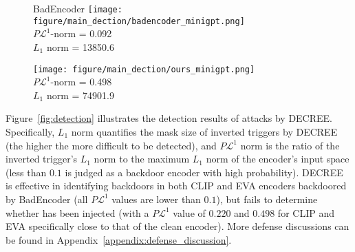 \begin{figure*}[t]
\begin{subfigure}[b]{0.15\textwidth}
\begin{minipage}{0.9\linewidth}
        \end{minipage}
    \end{subfigure}
    \begin{subfigure}[b]{0.135\textwidth}
        \centering
        \parbox{\linewidth}{\small BadEncoder \texttt{[image: figure/main\_dection/badencoder\_minigpt.png]} \\ \centering \scriptsize $P\mathcal{L}^1$-norm = 0.092 \\ $L_1$ norm = 13850.6}
    \end{subfigure}
    \begin{subfigure}[b]{0.135\textwidth}
        \centering
        \parbox{\linewidth}{\small \project \texttt{[image: figure/main\_dection/ours\_minigpt.png]} \\ \centering \scriptsize $P\mathcal{L}^1$-norm = 0.498 \\ $L_1$ norm = 74901.9}
    \end{subfigure}
    \vspace{-5pt}
    \caption{Backdoor detection results by DECREE~\cite{feng2023detecting}. $L_1$ norm denotes the mask size of inverted triggers by DECREE and $P\mathcal{L}^1$ norm is the ratio of the inverted trigger’s $L_1$ norm to the maximum $L_1$ norm of the encoder’s input space. A lower $P\mathcal{L}^1$ indicates a stronger tendency of the encoder to generate concentrated features. An encoder is deemed backdoored if its $P\mathcal{L}^1$ falls below $0.1$ ~\cite{feng2023detecting}.
    }
    \label{fig:detection}
    \vspace{-10px}
\end{figure*}
\noindent Figure~\ref{fig:detection} illustrates the detection results of attacks by DECREE. Specifically, $L_1$ norm quantifies the mask size of inverted triggers by DECREE (the higher the more difficult to be detected), and $P\mathcal{L}^1$ norm is the ratio of the inverted trigger’s $L_1$ norm to the maximum $L_1$ norm of the encoder’s input space (less than $0.1$ is judged as a backdoor encoder with high probability). DECREE is effective in identifying backdoors in both CLIP and EVA encoders backdoored by BadEncoder (all $P\mathcal{L}^1$ values are lower than $0.1$), but fails to determine whether \project has been injected (with a $P\mathcal{L}^1$ value of $0.220$ and $0.498$ for CLIP and EVA specifically close to that of the clean encoder). More defense discussions can be found in Appendix~\ref{appendix:defense_discussion}.

